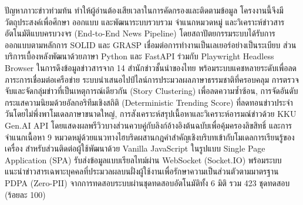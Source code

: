 ปัญหาภาวะข่าวท่วมท้น ทำให้ผู้อ่านต้องเสียเวลาในการคัดกรองและติดตามข้อมูล โครงงานนี้จึงมีวัตถุประสงค์เพื่อศึกษา ออกแบบ และพัฒนาระบบรวบรวม จำแนกหมวดหมู่ และวิเคราะห์ข่าวสารอัตโนมัติแบบครบวงจร (End-to-End News Pipeline) โดยสถาปัตยกรรมระบบได้รับการออกแบบตามหลักการ SOLID และ GRASP เชื่อมต่อการทำงานเป็นเลเยอร์อย่างเป็นระเบียบ ส่วนบริการเบื้องหลังพัฒนาด้วยภาษา Python และ FastAPI ร่วมกับ Playwright Headless Browser ในการดึงข้อมูลข่าวสารจาก 14 สำนักข่าวชั้นนำของไทย พร้อมระบบแคชหลายระดับเพื่อลดภาระการเชื่อมต่อเครือข่าย ระบบนำเสนอไปป์ไลน์การประมวลผลภาษาธรรมชาติที่ครอบคลุม การตรวจจับและจัดกลุ่มข่าวที่เป็นเหตุการณ์เดียวกัน (Story Clustering) เพื่อลดความซ้ำซ้อน, การจัดอันดับกระแสความนิยมด้วยอัลกอริทึมเชิงสถิติ (Deterministic Trending Score) ที่ลดทอนข่าวประจำวันโดยไม่พึ่งพาโมเดลภาษาขนาดใหญ่, การสังเคราะห์สรุปเนื้อหาและวิเคราะห์อารมณ์ข่าวด้วย KKU Gen.AI API โดยแสดงผลพรีวิวบางส่วนควบคู่กับลิงก์อ้างอิงต้นฉบับเพื่อคุ้มครองลิขสิทธิ์ และการจำแนกเนื้อหา 9 หมวดหมู่ด้วยแนวทางไฮบริดผสานกฎคำสำคัญเชิงบริบทเข้ากับโมเดลการเรียนรู้ของเครื่อง สำหรับส่วนติดต่อผู้ใช้พัฒนาด้วย Vanilla JavaScript ในรูปแบบ Single Page Application (SPA) รับส่งข้อมูลแบบเรียลไทม์ผ่าน WebSocket (Socket.IO) พร้อมระบบแนะนำข่าวสารเฉพาะบุคคลที่ประมวลผลบนฝั่งผู้ใช้งานเพื่อรักษาความเป็นส่วนตัวตามมาตรฐาน PDPA (Zero-PII) จากการทดสอบระบบผ่านชุดทดสอบอัตโนมัติทั้ง 6 มิติ รวม 423 ชุดทดสอบ (ร้อยละ 100)
